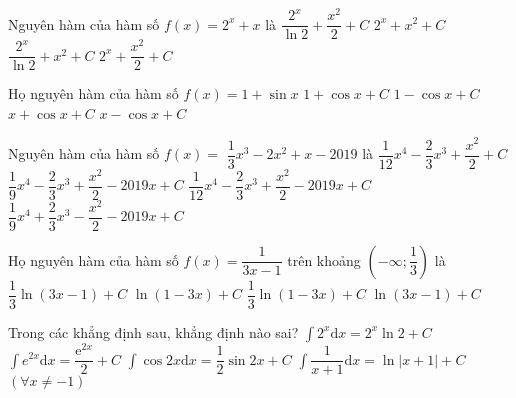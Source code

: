 \begin{ex}
	Nguyên hàm của hàm số $ f(x)=2^x+x$ là
	\choice
	{\True $\dfrac{2^x}{\ln 2}+\dfrac{x^2}{2}+C$}
	{$2^x+x^2+C$}
	{$\dfrac{2^x}{\ln 2}+x^2+C$}
	{$2^x+\dfrac{x^2}{2}+C$}
\end{ex}
\begin{ex}
	Họ nguyên hàm của hàm số $f(x)=1+\sin x$ 
	\choice
	{$ 1+\cos x+C$}
	{$ 1-\cos x+C$}
	{$ x+\cos x+C$}
	{\True $ x-\cos x+C$}
\end{ex}
\begin{ex}
	Nguyên hàm của hàm số $f(x)=$ $\dfrac{1}{3}{x^3}-2x^2+x-2019$ là
	\choice
	{$\dfrac{1}{12}{x^4}-\dfrac{2}{3}{x^3}+\dfrac{x^2}{2}+C$}
	{$\dfrac{1}{9}{x^4}-\dfrac{2}{3}{x^3}+\dfrac{x^2}{2}-2019x+C$}
	{\True $\dfrac{1}{12}{x^4}-\dfrac{2}{3}{x^3}+\dfrac{x^2}{2}-2019x+C$}
	{$\dfrac{1}{9}{x^4}+\dfrac{2}{3}{x^3}-\dfrac{x^2}{2}-2019x+C$}
\end{ex}
\begin{ex}
	Họ nguyên hàm của hàm số $ f(x)=\dfrac{1}{3x-1}$ trên khoảng $\left(-\infty ;\dfrac{1}{3}\right)$ là
	\choice
	{$\dfrac{1}{3}\ln (3x-1)+C$}
	{$\ln (1-3x)+C$}
	{\True $\dfrac{1}{3}\ln (1-3x)+C$}
	{$\ln (3x-1)+C$}
\end{ex}
\begin{ex}
	Trong các khẳng định sau, khẳng định nào sai?
	\choice
	{\True $\displaystyle\int{2^x\mathrm{d}x}=2^x\ln 2+C$}
	{$\displaystyle\int{{e}^{2x}\mathrm{d}x}=\dfrac{{\mathrm{e}}^{2x}}{2}+C$}
	{$\displaystyle\int{\cos 2x\mathrm{d}x}=\dfrac{1}{2}\sin 2x+C$}
	{$\displaystyle\int{\dfrac{1}{x+1}\mathrm{d}x}=\ln\left| x+1\right|+C$ $\left(\forall x\ne-1\right)$}
\end{ex}
